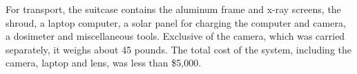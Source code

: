 For transport, the suitcase contains the aluminum frame and x-ray screens, the shroud, a laptop computer, a solar panel for charging the computer and camera, a dosimeter and miscellaneous tools. Exclusive of the camera, which was carried separately, it weighs about 45 pounds. The total cost of the system, including the camera, laptop and lens, was less than \$5,000.

%
%
%	
%	
%	
%	
%

